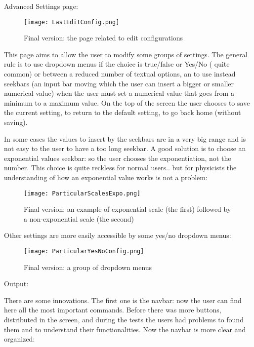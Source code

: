 Advanced Settings page:

\begin{figure}[H]
\centering
\texttt{[image: LastEditConfig.png]} 
\caption{Final version: the page related to edit configurations}
\end{figure}   

This page aims to allow the user to modify some groups of settings. The general rule is to use dropdown menus if the choice is true/false or Yes/No (	quite common) or between a reduced number of textual options, an to use instead  seekbars (an input bar moving which the user can insert a bigger or smaller numerical value) when the user must set a numerical value that goes from a minimum to a maximum value. On the top of the screen the user chooses to save the current setting, to return to the default setting, to go back home (without saving).    

In some cases the values to insert by the seekbars are in a very big range and is not easy to the user to have a too long seekbar. A good solution is to choose an exponential values seekbar: so the user chooses the exponentiation, not the number. This choice is quite reckless for normal users.. but for physicists the understanding of how an exponential value works is not a problem:

\begin{figure}[H]
\centering
\texttt{[image: ParticularScalesExpo.png]} 
\caption{ Final version: an example of exponential scale (the first) followed by a non-exponential scale (the second) }
\end{figure}  

\newpage

Other settings are more easily accessible by some yes/no dropdown menus:


\begin{figure}[H]
\centering
\texttt{[image: ParticularYesNoConfig.png]} 
\caption{ Final version: a group of dropdown menus }
\end{figure}  

\newpage

Output: 

There are some innovations. The first one is the navbar: now the user can find here all the most important commands. Before there was more buttons, distributed in the screen, and during the tests the users had problems to found them and to understand their functionalities. Now the navbar is more clear and organized:

